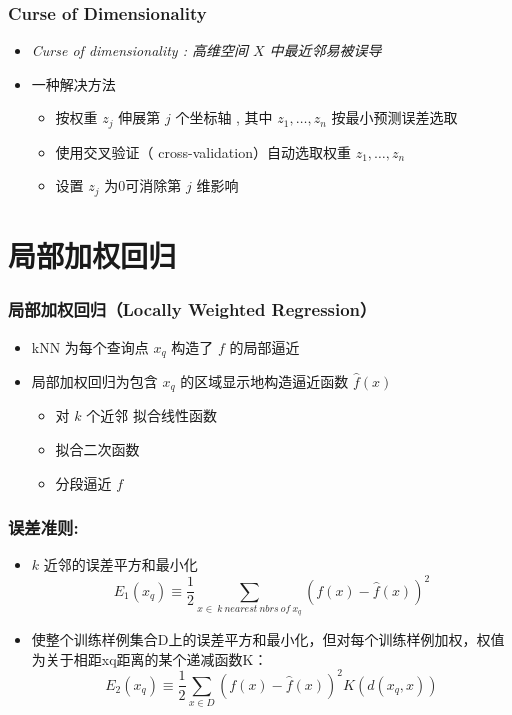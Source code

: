 \documentclass{beamer}
\begin{document}
\begin{frame}
\frametitle{Curse of Dimensionality}
\label{sec-2-7}

\begin{itemize}
\item \em{ Curse of dimensionality} : 高维空间 $X$ 中最近邻易被误导
\item 一种解决方法
\begin{itemize}
\item 按权重 $z_j$ 伸展第 $j$ 个坐标轴 ,  其中 $z_1, \ldots, z_n$ 按最小预测误差选取
\item 使用交叉验证（ cross-validation）自动选取权重 $z_1, \ldots, z_n$
\item 设置 $z_j$ 为0可消除第 $j$ 维影响
\end{itemize}
\end{itemize}
\end{frame}
\section{局部加权回归}
\label{sec-3}
\begin{frame}
\frametitle{局部加权回归（Locally Weighted Regression）}
\label{sec-3-1}

\begin{itemize}
\item kNN 为每个查询点 $x_q$ 构造了 $f$ 的局部逼近
\item 局部加权回归为包含 $x_q$ 的区域显示地构造逼近函数 $\hat{f}(x)$
\begin{itemize}
\item 对 $k$ 个近邻 拟合线性函数
\item 拟合二次函数
\item 分段逼近 $f$
\end{itemize}
\end{itemize}
\end{frame}
\begin{frame}
\frametitle{误差准则:}
\label{sec-3-2}

\begin{itemize}
\item $k$ 近邻的误差平方和最小化
      $$E_{1}(x_q) \equiv \frac{1}{2} \sum_{x \in\ k\ nearest\ nbrs\ of\ x_q} (f(x)- \hat{f}(x))^2$$
\item 使整个训练样例集合D上的误差平方和最小化，但对每个训练样例加权，权值为关于相距xq距离的某个递减函数K：
      $$E_{2}(x_q) \equiv \frac{1}{2} \sum_{x \in D} (f(x) - \hat{f}(x))^2 K(d(x_{q}, x))$$
\end{itemize}
\end{frame}
\end{document}
